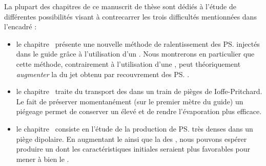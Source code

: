 \noindent La plupart des chapitres de ce manuscrit de thèse sont dédiés à l'étude de différentes possibilités visant à contrecarrer les trois difficultés mentionnées dans l'encadré  :
\begin{itemize}
	\item le chapitre~ présente une nouvelle méthode de ralentissement des \ps injectés dans le guide grâce à l'utilisation d'un \mimamo. Nous montrerons en particulier que cette méthode, contrairement à l'utilisation d'une \secpent, peut théoriquement \emph{augmenter} la \ddedpup du jet obtenu par recouvrement des \ps.
	\item le chapitre~ traite du transport des \pats dans un train de pièges de Ioffe-Pritchard. Le fait de préserver momentanément (sur le premier mètre du guide) un piégeage \td permet de conserver un \tcolel élevé et de rendre l'évaporation plus efficace.
	\item le chapitre~ consiste en l'étude de la production de \ps très denses dans un piège dipolaire. En augmentant le \tcolel ainsi que la \ddedp des \pats, nous pouvons espérer produire un \jatuf dont les caractéristiques initiales seraient plus favorables pour mener à bien le \rpef.
\end{itemize}
